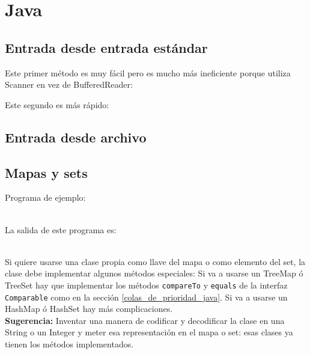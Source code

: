 \documentclass[10pt,letterpaper,twocolumn,twosided]{article}
\newcommand{\codigofuente}[1]{

\dotfill
}
\begin{document}
\section{Java}
\subsection{Entrada desde entrada estándar}
Este primer método es muy fácil pero es mucho más ineficiente porque utiliza Scanner en vez de BufferedReader:
\codigofuente{./src/java/io_estandar_easy.java}

\bigskip

Este segundo es más rápido:
\codigofuente{./src/java/io_estandar.java}
\subsection{Entrada desde archivo}
\codigofuente{./src/java/io_file.java}

\subsection{Mapas y sets}
Programa de ejemplo:
\codigofuente{./src/java/maps_sets.java} \\
La salida de este programa es: \\
\bigskip
\ttfamily
{}
\\ \normalfont\normalsize
\bigskip

Si quiere usarse una clase propia como llave del mapa o como elemento del set, la clase debe implementar
algunos métodos especiales: Si va a usarse un TreeMap ó TreeSet hay que implementar los métodos \texttt{compareTo} y
\texttt{equals} de la interfaz \texttt{Comparable} como en la sección \ref{colas_de_prioridad_java}. Si va a usarse
un HashMap ó HashSet hay más complicaciones.\\
\smallskip
\textbf{Sugerencia:} Inventar una manera de codificar y decodificar la clase en una String o un Integer y meter esa representación en el mapa o set: esas clases ya tienen los métodos implementados.
\end{document}
